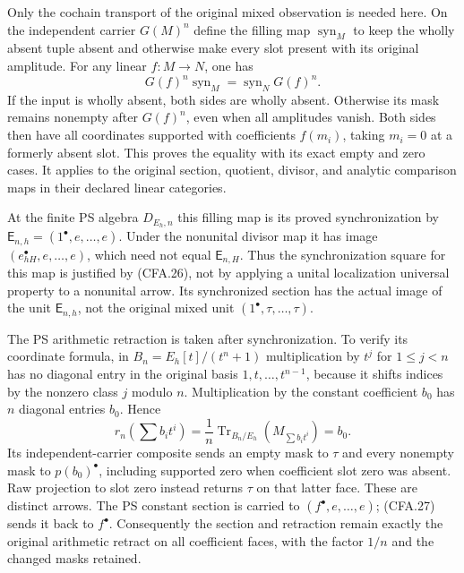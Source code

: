 Only the cochain transport of the original mixed observation is needed
here.  On the independent carrier $G(M)^n$ define the filling map
$\operatorname{syn}_M$ to keep the wholly absent tuple absent and
otherwise make every slot present with its original amplitude.
For any linear $f:M\to N$, one has
\[
 G(f)^n\operatorname{syn}_M
       =\operatorname{syn}_N G(f)^n.                          \tag{CFA.26}
\]
If the input is wholly absent, both sides are wholly absent.
Otherwise its mask remains nonempty after $G(f)^n$, even when all
amplitudes vanish.  Both sides then have all coordinates supported
with coefficients $f(m_i)$, taking $m_i=0$ at a formerly absent
slot.  This proves the equality with its exact empty and zero cases.
It applies to the original section, quotient, divisor, and analytic
comparison maps in their declared linear categories.

At the finite PS algebra $D_{E_h,n}$ this filling map is its proved
synchronization by $\mathsf E_{n,h}=(1^\bullet,e,\ldots,e)$.
Under the nonunital divisor map it has image
$(e_{hH}^\bullet,e,\ldots,e)$, which need not equal
$\mathsf E_{n,H}$.  Thus the synchronization square for this map
is justified by (CFA.26), not by applying a unital localization
universal property to a nonunital arrow.  Its synchronized section
has the actual image of the unit $\mathsf E_{n,h}$, not the original
mixed unit $(1^\bullet,\tau,\ldots,\tau)$.

The PS arithmetic retraction is taken after synchronization.  To verify
its coordinate formula, in $B_n=E_h[t]/(t^n+1)$ multiplication by
$t^j$ for $1\le j<n$ has no diagonal entry in the original basis
$1,t,\ldots,t^{n-1}$, because it shifts indices by the nonzero
class $j$ modulo $n$.  Multiplication by the constant coefficient
$b_0$ has $n$ diagonal entries $b_0$.  Hence
\[
 r_n\left(\sum b_it^i\right)=
 \frac1n\operatorname{Tr}_{B_n/E_h}(M_{\sum b_it^i})=b_0.
                                                               \tag{CFA.27}
\]
Its independent-carrier composite sends an empty mask to $\tau$
and every nonempty mask to $p(b_0)^\bullet$, including supported
zero when coefficient slot zero was absent.  Raw projection to slot
zero instead returns $\tau$ on that latter face.  These are distinct
arrows.  The PS constant section is carried to
$(f^\bullet,e,\ldots,e)$; (CFA.27) sends it back to $f^\bullet$.
Consequently the section and retraction remain exactly the original
arithmetic retract on all coefficient faces, with the factor $1/n$
and the changed masks retained.

